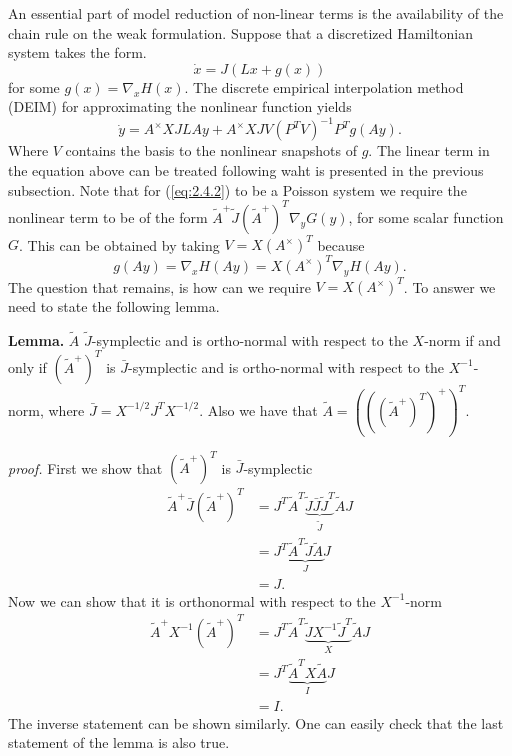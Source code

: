 \documentclass[12pt]{article}
\begin{document}
An essential part of model reduction of non-linear terms is the availability of the chain rule on the weak formulation. Suppose that a discretized Hamiltonian system takes the form.
\begin{equation} \label{eq:2.4.1}
	\dot x = J (L x + g(x) ) 
\end{equation}
for some $g(x) = \nabla_x H(x)$. The discrete empirical interpolation method (DEIM) for approximating the nonlinear function yields
\begin{equation} \label{eq:2.4.2}
	\dot y = A^{\times} X J LAy + A^{\times} X J V(P^TV)^{-1} P^T g(Ay).
\end{equation}
Where $V$ contains the basis to the nonlinear snapshots of $g$. The linear term in the equation above can be treated following waht is presented in the previous subsection. Note that for (\ref{eq:2.4.2}) to be a Poisson system we require the nonlinear term to be of the form $\tilde A ^+ \tilde J (\tilde A ^+)^T \nabla_y G(y)$, for some scalar function $G$. This can be obtained by taking $V = X (A^{\times})^T$ because
\begin{equation}
 	g(Ay) = \nabla_x H(Ay) = X (A^{\times})^T \nabla_y H(Ay).
\end{equation}
The question that remains, is how can we require $V = X (A^{\times})^T$. To answer we need to state the following lemma.

\textbf{Lemma. }$\tilde A$ $\tilde J$-symplectic and is ortho-normal with respect to the $X$-norm if and only if $(\tilde A^+)^T$ is $\bar J$-symplectic and is ortho-normal with respect to the $X^{-1}$-norm, where $\bar J = X^{-1/2}J^TX^{-1/2}$. Also we have that $\tilde A = \left( \left( \left(\tilde A^+\right)^T \right)^+ \right)^T$.

\emph{proof. }First we show that $(\tilde A^+)^T$ is $\bar J$-symplectic
\begin{equation}
\begin{aligned}
	\tilde A^+ \bar J (\tilde A^+)^T &= J^T \tilde A^T\underbrace{ \tilde J \bar J \tilde J ^T }_{\tilde J} \tilde A J \\
	&= J^T \underbrace{ \tilde A^T \tilde J \tilde A}_{J} J \\
	&= J.
\end{aligned}
\end{equation}
Now we can show that it is orthonormal with respect to the $X^{-1}$-norm
\begin{equation}
\begin{aligned}
	\tilde A^+ X^{-1} (\tilde A^+)^T &= J^T \tilde A^T \underbrace{ \tilde J X^{-1} \tilde J ^T}_{X} \tilde A J \\
	&= J^T \underbrace{ \tilde A^T X \tilde A }_{I} J \\
	&= I.
\end{aligned}
\end{equation}
The inverse statement can be shown similarly. One can easily check that the last statement of the lemma is also true.
\end{document}
